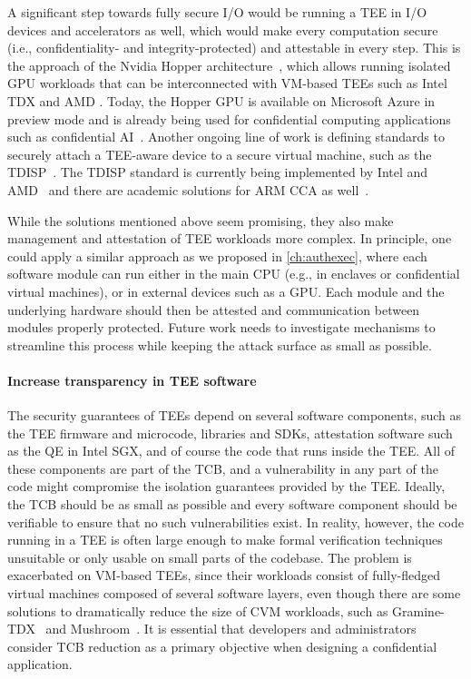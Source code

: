 A significant step towards fully secure I/O would be running a \ac{TEE} in I/O
devices and accelerators as well, which would make every computation secure
(i.e., confidentiality- and integrity-protected) and attestable in every step.
This is the approach of the Nvidia Hopper architecture~\cite{nvidiaCC}, which
allows running isolated GPU workloads that can be interconnected with
\acs{VM}-based \acp{TEE} such as Intel \ac{TDX} and AMD \sevsnp. Today, the
Hopper GPU is available on Microsoft Azure in preview mode and is already being
used for confidential computing applications such as confidential
AI~\cite{edgelessContinuumAI}. Another ongoing line of work is defining
standards to securely attach a \ac{TEE}-aware device to a secure virtual
machine, such as the \ac{TDISP}~\cite{tdispSpec}. The \ac{TDISP} standard is
currently being implemented by Intel and
AMD~\cite{intelTdxConnect,AmdSevTioWhitepaper} and there are academic solutions
for ARM \ac{CCA} as well~\cite{sridhara2024acai}.

While the solutions mentioned above seem promising, they also make management
and attestation of \ac{TEE} workloads more complex. In principle, one could
apply a similar approach as we proposed in \cref{ch:authexec}, where each
software module can run either in the main CPU (e.g., in enclaves or
confidential virtual machines), or in external devices such as a GPU. Each
module and the underlying hardware should then be attested and communication
between modules properly protected. Future work needs to investigate mechanisms
to streamline this process while keeping the attack surface as small as
possible.

\paragraph{Increase transparency in TEE software}

The security guarantees of \acp{TEE} depend on several software components, such
as the \ac{TEE} firmware and microcode, libraries and \acp{SDK}, attestation
software such as the \ac{QE} in Intel \ac{SGX}, and of course the code that runs
inside the \ac{TEE}. All of these components are part of the \ac{TCB}, and a
vulnerability in any part of the code might compromise the isolation guarantees
provided by the \ac{TEE}. Ideally, the \ac{TCB} should be as small as possible
and every software component should be verifiable to ensure that no such
vulnerabilities exist. In reality, however, the code running in a \ac{TEE} is
often large enough to make formal verification techniques unsuitable or only
usable on small parts of the codebase. The problem is exacerbated on
\acs{VM}-based \acp{TEE}, since their workloads consist of fully-fledged virtual
machines composed of several software layers, even though there are some
solutions to dramatically reduce the size of \ac{CVM} workloads, such as
Gramine-TDX~\cite{kuvaiskii2024gramine} and Mushroom~\cite{mushroomTee}. It is
essential that developers and administrators consider \ac{TCB} reduction as a
primary objective when designing a confidential application.

